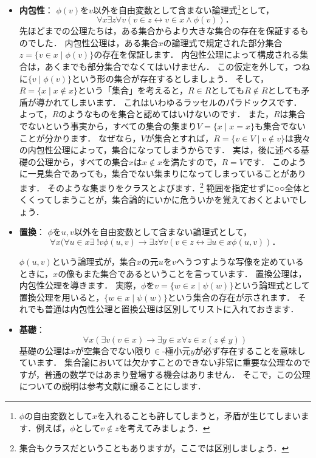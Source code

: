 \documentclass[./main]{subfiles}
\newcommand{\tbf}{\textbf}
\begin{document}
\begin{itemize}
\item
\tbf{内包性}：
$\phi(v)$を$v$以外を自由変数として含まない論理式\footnote{$\phi$の自由変数として$x$を入れることも許してしまうと，矛盾が生じてしまいます．例えば，$\phi$として$v\notin z$を考えてみましょう．}として，
\[
\forall x\exists z\forall v(v\in z\leftrightarrow v\in x\wedge\phi(v))．
\]
先ほどまでの公理たちは，ある集合からより大きな集合の存在を保証するものでした．
内包性公理は，ある集合$x$の論理式で規定された部分集合$z=\{v\in x\mid\phi(v)\}$の存在を保証します．
内包性公理によって構成される集合は，あくまでも部分集合でなくてはいけません．
この仮定を外して，つねに$\{v\mid\phi(v)\}$という形の集合が存在するとしましょう．
そして，$R=\{x\mid x\notin x\}$という「集合」を考えると，$R\in R$としても$R\notin R$としても矛盾が導かれてしまいます．
これはいわゆるラッセルのパラドックスです．
よって，$R$のようなものを集合と認めてはいけないのです．
また，$R$は集合でないという事実から，すべての集合の集まり$V=\{x\mid x=x\}$も集合でないことが分かります．
なぜなら，$V$が集合とすれば，$R=\{v\in V\mid v\notin v\}$は我々の内包性公理によって，集合になってしまうからです．
実は，後に述べる基礎の公理から，すべての集合$x$は$x\notin x$を満たすので，$R=V$です．
このように一見集合であっても，集合でない集まりになってしまっていることがあります．
そのような集まりをクラスとよびます．\footnote{集合もクラスだということもありますが，ここでは区別しましょう．}
範囲を指定せずに○○全体とくくってしまうことが，集合論的にいかに危ういかを覚えておくとよいでしょう．

\item
\tbf{置換}：
$\phi$を$u,v$以外を自由変数として含まない論理式として，
\[
\forall x(\forall u\in x\exists\;! v\phi(u,v)\to\exists z\forall v(v\in z\leftrightarrow\exists u\in x\phi(u,v))．
\]

$\phi(u, v)$という論理式が，集合$x$の元$u$を$v$へうつすような写像を定めているときに，$x$の像もまた集合であるということを言っています．
置換公理は，内包性公理を導きます．
実際，$\phi$を$v=\{w\in x\mid \psi(w)\}$という論理式として置換公理を用いると，$\{w\in x\mid\psi(w)\}$という集合の存在が示されます．
それでも普通は内包性公理と置換公理は区別してリストに入れておきます．

\item
\tbf{基礎}：
\[
\forall x(\exists v(v\in x)\to\exists y\in x\forall z\in x(z\notin y))
\]
基礎の公理は$x$が空集合でない限り$\in$-極小元$y$が必ず存在することを意味しています．
集合論においては欠かすことのできない非常に重要な公理なのですが，普通の数学ではあまり登場する機会はありません．
そこで，この公理についての説明は参考文献に譲ることにします．
\end{itemize}
\end{document}
